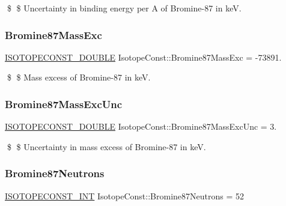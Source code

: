 \$ \$ Uncertainty in binding energy per A of Bromine-\/87 in keV. \mbox{\label{group___isotope_const-_bromine-_br87_ga301b77066bcfaab84b2a8e77b8118558}} 
\subsubsection{\texorpdfstring{Bromine87\+Mass\+Exc}{Bromine87MassExc}}
{\footnotesize\ttfamily \mbox{\hyperlink{group___isotope_const-_macros_ga8f45a7272ce02c0b4c65c44636ed719a}{I\+S\+O\+T\+O\+P\+E\+C\+O\+N\+S\+T\+\_\+\+D\+O\+U\+B\+LE}} Isotope\+Const\+::\+Bromine87\+Mass\+Exc = -\/73891.}

\$ \$ Mass excess of Bromine-\/87 in keV. \mbox{\label{group___isotope_const-_bromine-_br87_ga6e46e1382a8ef11719ee3c72e8ed2fdb}} 
\subsubsection{\texorpdfstring{Bromine87\+Mass\+Exc\+Unc}{Bromine87MassExcUnc}}
{\footnotesize\ttfamily \mbox{\hyperlink{group___isotope_const-_macros_ga8f45a7272ce02c0b4c65c44636ed719a}{I\+S\+O\+T\+O\+P\+E\+C\+O\+N\+S\+T\+\_\+\+D\+O\+U\+B\+LE}} Isotope\+Const\+::\+Bromine87\+Mass\+Exc\+Unc = 3.}

\$ \$ Uncertainty in mass excess of Bromine-\/87 in keV. \mbox{\label{group___isotope_const-_bromine-_br87_ga9dd64e27e11339824addc7087ad02d56}} 
\subsubsection{\texorpdfstring{Bromine87\+Neutrons}{Bromine87Neutrons}}
{\footnotesize\ttfamily \mbox{\hyperlink{group___isotope_const-_macros_ga5f18360b3e99483a35c32d789e62621c}{I\+S\+O\+T\+O\+P\+E\+C\+O\+N\+S\+T\+\_\+\+I\+NT}} Isotope\+Const\+::\+Bromine87\+Neutrons = 52}

